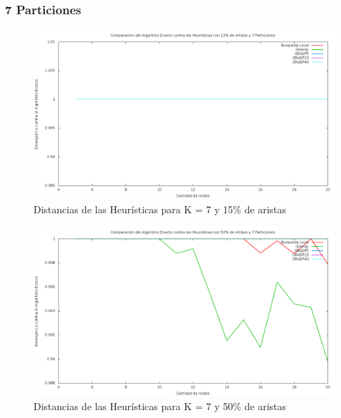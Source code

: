 \subsubsection{7 Particiones}

\begin{figure}[H]
\begin{center}
\includegraphics[scale=0.3]{finales/ComparacionesCon7Particiones15Aristas.png}
\caption{Distancias de las Heur\'isticas para K = 7 y 15\% de aristas}
\end{center}
\end{figure}

\begin{figure}[H]
\begin{center}
\includegraphics[scale=0.3]{finales/ComparacionesCon7Particiones50Aristas.png}
\caption{Distancias de las Heur\'isticas para K = 7 y 50\% de aristas}
\end{center}
\end{figure}

